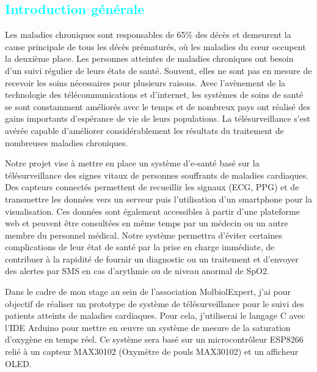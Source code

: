 
\begin{flushleft}
\section*{\textcolor{cyan}{Introduction générale}}
 Les maladies chroniques sont responsables de 65\% des décès et demeurent la cause principale de tous les décès prématurés, où les maladies du cœur occupent la deuxième place. Les personnes atteintes de maladies chroniques ont besoin d’un suivi régulier de leurs états de santé. Souvent, elles ne sont pas en mesure de recevoir les soins nécessaires pour plusieurs raisons. Avec l'avènement de la technologie des télécommunications et d’internet, les systèmes de soins de santé se sont constamment améliorés avec le temps et de nombreux pays ont réalisé des gains importants d'espérance de vie de leurs populations. La télésurveillance s'est avérée capable d'améliorer considérablement les résultats du traitement de nombreuses maladies chroniques. \newline
 
 Notre projet vise à mettre en place un système d'e-santé basé sur la télésurveillance des signes vitaux de personnes souffrants de maladies cardiaques. Des capteurs connectés permettent de recueillir les signaux (ECG, PPG) et de transmettre les données vers un serveur puis l'utilisation d'un smartphone pour la visualisation. Ces données sont également accessibles à partir d'une plateforme web et peuvent être consultées en même temps par un médecin ou un autre membre du personnel médical. Notre système permettra d'éviter certaines complications de leur état de santé par la prise en 
 charge immédiate, de contribuer à la rapidité de fournir un diagnostic
  ou un traitement et d'envoyer des alertes par SMS en cas d'arythmie ou de niveau anormal de SpO2.\newline
 
 Dans le cadre de mon stage au sein de l'association MolbiolExpert, j'ai pour objectif de réaliser un prototype de système de télésurveillance pour le suivi des patients atteints de maladies cardiaques. Pour cela, j'utiliserai le langage C avec l'IDE Arduino pour mettre en œuvre un système de mesure de la saturation d'oxygène en temps réel. Ce système sera basé sur un microcontrôleur ESP8266 relié à un capteur MAX30102 (Oxymètre de pouls MAX30102) et un afficheur OLED. \newline
 
 

\end{flushleft}

\newpage
	